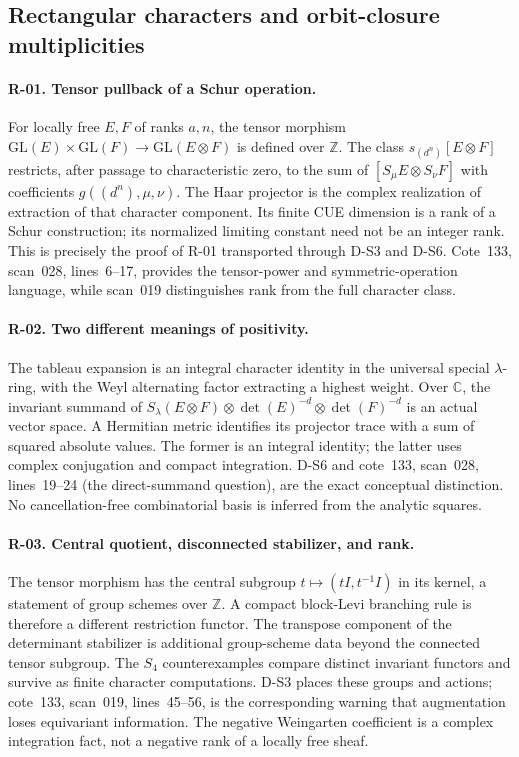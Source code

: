\documentclass[11pt,a4paper]{article}
\theoremstyle{definition}\newtheorem{definition}{Definition}
\begin{document}
\subsection{Rectangular characters and orbit-closure multiplicities}

\paragraph{R-01. Tensor pullback of a Schur operation.}
For locally free $E,F$ of ranks $a,n$, the tensor morphism $\mathrm{GL}(E)\times\mathrm{GL}(F)\to\mathrm{GL}(E\otimes F)$ is defined over $\mathbb Z$. The class $s_{(d^n)}[E\otimes F]$ restricts, after passage to characteristic zero, to the sum of $[S_\mu E\otimes S_\nu F]$ with coefficients $g((d^n),\mu,\nu)$. The Haar projector is the complex realization of extraction of that character component. Its finite CUE dimension is a rank of a Schur construction; its normalized limiting constant need not be an integer rank. This is precisely the proof of R-01 transported through D-S3 and D-S6. Cote~133, scan~028, lines~6--17, provides the tensor-power and symmetric-operation language, while scan~019 distinguishes rank from the full character class.

\paragraph{R-02. Two different meanings of positivity.}
The tableau expansion is an integral character identity in the universal special $\lambda$-ring, with the Weyl alternating factor extracting a highest weight. Over $\mathbb C$, the invariant summand of $S_\lambda(E\otimes F)\otimes\det(E)^{-d}\otimes\det(F)^{-d}$ is an actual vector space. A Hermitian metric identifies its projector trace with a sum of squared absolute values. The former is an integral identity; the latter uses complex conjugation and compact integration. D-S6 and cote~133, scan~028, lines~19--24 (the direct-summand question), are the exact conceptual distinction. No cancellation-free combinatorial basis is inferred from the analytic squares.

\paragraph{R-03. Central quotient, disconnected stabilizer, and rank.}
The tensor morphism has the central subgroup $t\mapsto(tI,t^{-1}I)$ in its kernel, a statement of group schemes over $\mathbb Z$. A compact block-Levi branching rule is therefore a different restriction functor. The transpose component of the determinant stabilizer is additional group-scheme data beyond the connected tensor subgroup. The $S_4$ counterexamples compare distinct invariant functors and survive as finite character computations. D-S3 places these groups and actions; cote~133, scan~019, lines~45--56, is the corresponding warning that augmentation loses equivariant information. The negative Weingarten coefficient is a complex integration fact, not a negative rank of a locally free sheaf.
\end{document}
